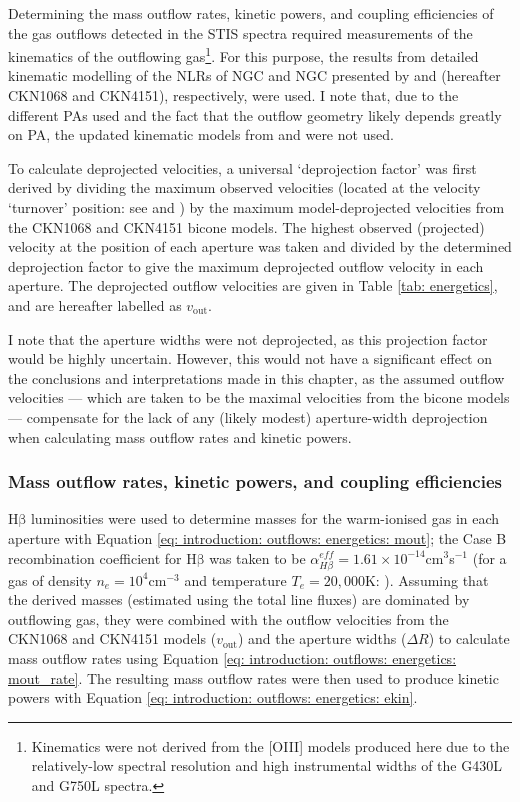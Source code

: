 Determining the mass outflow rates, kinetic powers, and coupling efficiencies of the gas outflows detected in the STIS spectra required measurements of the kinematics of the outflowing gas\footnote{Kinematics were not derived from the [OIII] models produced here due to the relatively-low spectral resolution and high instrumental widths of the G430L and G750L spectra.}. For this purpose, the results from detailed kinematic modelling of the NLRs of NGC and NGC presented by \citet{Crenshaw2000_N1068} and \citet{Crenshaw2000_N4151} (hereafter CKN1068 and CKN4151), respectively, were used. I note that, due to the different PAs used and the fact that the outflow geometry likely depends greatly on PA, the updated kinematic models from \citet{Das2005} and \citet{Das2006} were not used. 

To calculate deprojected velocities, a universal `deprojection factor' was first derived by dividing the maximum observed velocities (located at the velocity `turnover' position: see \citealt{Crenshaw2000_N1068} and \citealt{Crenshaw2000_N4151}) by the maximum model-deprojected velocities from the CKN1068 and CKN4151 bicone models. The highest observed (projected) velocity at the position of each aperture was taken and divided by the determined deprojection factor to give the maximum deprojected outflow velocity in each aperture. The deprojected outflow velocities are given in Table \ref{tab: energetics}, and are hereafter labelled as $v_\mathrm{out}$. 

I note that the aperture widths were not deprojected, as this projection factor would be highly uncertain. However, this would not have a significant effect on the conclusions and interpretations made in this chapter, as the assumed outflow velocities --- which are taken to be the maximal velocities from the bicone models --- compensate for the lack of any (likely modest) aperture-width deprojection when calculating mass outflow rates and kinetic powers.

\subsubsection{Mass outflow rates, kinetic powers, and coupling efficiencies}
\label{section: stis_seyferts: mout_ekin_fkin}

H$\mathrm{\beta}$ luminosities were used to determine masses for the warm-ionised gas in each aperture with Equation \ref{eq: introduction: outflows: energetics: mout}; the Case B recombination coefficient for H$\mathrm{\beta}$ was taken to be $\alpha^{eff}_{H\beta}=1.61\times10^{-14}$\;cm$^3$\;s$^{-1}$ (for a gas of density $n_e=10^4$\;cm$^{-3}$ and temperature $T_e=20,000$\;K: \citealt{Osterbrock2006}). Assuming that the derived masses (estimated using the total line fluxes) are dominated by outflowing gas, they were combined with the outflow velocities from the CKN1068 and CKN4151 models ($v_\mathrm{out}$) and the aperture widths ($\Delta R$) to calculate mass outflow rates using Equation \ref{eq: introduction: outflows: energetics: mout_rate}. The resulting mass outflow rates were then used to produce kinetic powers with Equation \ref{eq: introduction: outflows: energetics: ekin}.

